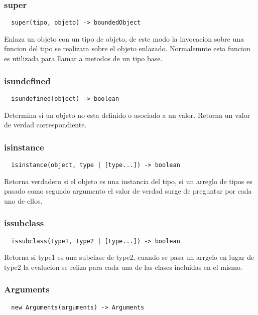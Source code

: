 \subsubsection*{super}
\begin{verbatim}
  super(tipo, objeto) -> boundedObject
\end{verbatim}
Enlaza un objeto con un tipo de objeto, de este modo la invocacion sobre una
funcion del tipo se realizara sobre el objeto enlazado.
Normalemnte esta funcion es utilizada para llamar a metodos de un tipo base.

\subsubsection*{isundefined}
\begin{verbatim}
  isundefined(object) -> boolean
\end{verbatim}
Determina si un objeto no esta definido o asociado a un valor. Retorna un valor
de verdad correspondiente.

\subsubsection*{isinstance}
\begin{verbatim}
  isinstance(object, type | [type...]) -> boolean
\end{verbatim}
Retorna verdadero si el objeto es una instancia del tipo, si un arreglo de tipos
es pasado como segundo argumento el valor de verdad surge de preguntar por cada
uno de ellos.

\subsubsection*{issubclass}
\begin{verbatim}
  issubclass(type1, type2 | [type...]) -> boolean
\end{verbatim}
Retorna si type1 es una subclase de type2, cuando se pasa un arrgelo en lugar de
type2 la evalucion se reliza para cada una de las clases incluidas en el mismo.

\subsubsection*{Arguments}
\begin{verbatim}
  new Arguments(arguments) -> Arguments
\end{verbatim}

